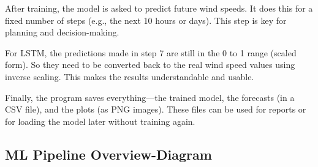 \begin{description}[style=nextline,leftmargin=1.5cm]
	\item[\textbf{7. Forecasting}]
	After training, the model is asked to predict future wind speeds. It does this for a fixed number of steps (e.g., the next 10 hours or days). This step is key for planning and decision-making.
	
	\item[\textbf{8. Post-processing}]
	For LSTM, the predictions made in step 7 are still in the 0 to 1 range (scaled form). So they need to be converted back to the real wind speed values using inverse scaling. This makes the results understandable and usable.
	
	\item[\textbf{9. Output Saving}]
	Finally, the program saves everything---the trained model, the forecasts (in a CSV file), and the plots (as PNG images). These files can be used for reports or for loading the model later without training again.
\end{description}

\subsection{ ML Pipeline Overview-Diagram}

